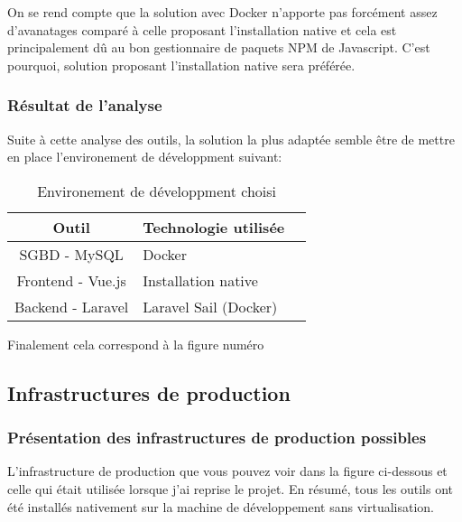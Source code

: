 \documentclass[
    iai, %
    il, %
]{heig-tb}
\begin{document}
On se rend compte que la solution avec Docker n'apporte pas forcément assez d'avanatages comparé à celle proposant l'installation native et cela est principalement dû au bon gestionnaire de paquets NPM de Javascript. C'est pourquoi, solution proposant l'installation native sera préférée.

\subsubsection{Résultat de l'analyse}
Suite à cette analyse des outils, la solution la plus adaptée semble être de mettre en place l'environement de développment suivant:

\begin{table}[h]
    \begin{center}
        \caption{Environement de développment choisi \label{env_dev}}
        \begin{tabular}{c|l|r}
            Outil             & Technologie utilisée  \\ \hline
            SGBD - MySQL      & Docker                \\
            Frontend - Vue.js & Installation native   \\
            Backend - Laravel & Laravel Sail (Docker) \\
        \end{tabular}
    \end{center}
\end{table}


Finalement cela correspond à la figure numéro %

\clearpage
\subsection{Infrastructures de production}

\subsubsection{Présentation des infrastructures de production possibles}
L'infrastructure de production que vous pouvez voir dans la figure ci-dessous et celle qui était utilisée lorsque j'ai reprise le projet.\newline
En résumé, tous les outils ont été installés nativement sur la machine de développement sans virtualisation.\newline
{}
\end{document}
